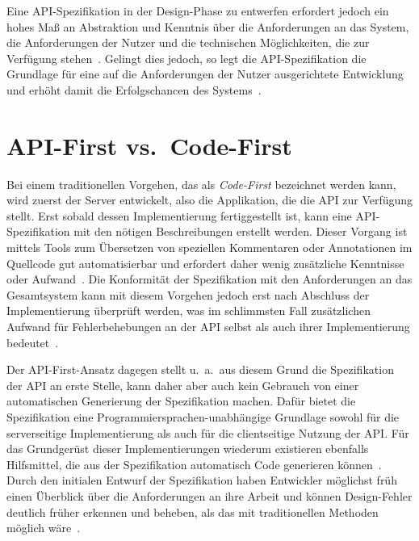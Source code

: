 Eine \ac{API}-Spezifikation in der Design-Phase zu entwerfen erfordert jedoch ein hohes Maß an Abstraktion und Kenntnis über die Anforderungen an das System, die Anforderungen der Nutzer und die technischen Möglichkeiten, die zur Verfügung stehen~\autocite[362]{de23}.
Gelingt dies jedoch, so legt die \ac{API}-Spezifikation die Grundlage für eine auf die Anforderungen der Nutzer ausgerichtete Entwicklung und erhöht damit die Erfolgschancen des Systems~\autocite[1627]{cha21}.

\section{API-First vs.\ Code-First}
Bei einem traditionellen Vorgehen, das als \emph{Code-First} bezeichnet werden kann, wird zuerst der Server entwickelt, also die Applikation, die die \ac{API} zur Verfügung stellt.
Erst sobald dessen Implementierung fertiggestellt ist, kann eine \ac{API}-Spezifikation mit den nötigen Beschreibungen erstellt werden.
Dieser Vorgang ist mittels Tools zum Übersetzen von speziellen Kommentaren oder Annotationen im Quellcode gut automatisierbar und erfordert daher wenig zusätzliche Kenntnisse oder Aufwand~\autocite{ope24}.
Die Konformität der Spezifikation mit den Anforderungen an das Gesamtsystem kann mit diesem Vorgehen jedoch erst nach Abschluss der Implementierung überprüft werden, was im schlimmsten Fall zusätzlichen Aufwand für Fehlerbehebungen an der \ac{API} selbst als auch ihrer Implementierung bedeutet~\autocite{vol22}.

Der API-First-Ansatz dagegen stellt u.\ a.\ aus diesem Grund die Spezifikation der \ac{API} an erste Stelle, kann daher aber auch kein Gebrauch von einer automatischen Generierung der Spezifikation machen.
Dafür bietet die Spezifikation eine Programmiersprachen-unabhängige Grundlage sowohl für die serverseitige Implementierung als auch für die clientseitige Nutzung der \ac{API}.
Für das Grundgerüst dieser Implementierungen wiederum existieren ebenfalls Hilfsmittel, die aus der Spezifikation automatisch Code generieren können~\autocite{ope24}.
Durch den initialen Entwurf der Spezifikation haben Entwickler möglichst früh einen Überblick über die Anforderungen an ihre Arbeit und können Design-Fehler deutlich früher erkennen und beheben, als das mit traditionellen Methoden möglich wäre~\autocite[1627]{cha21}.

